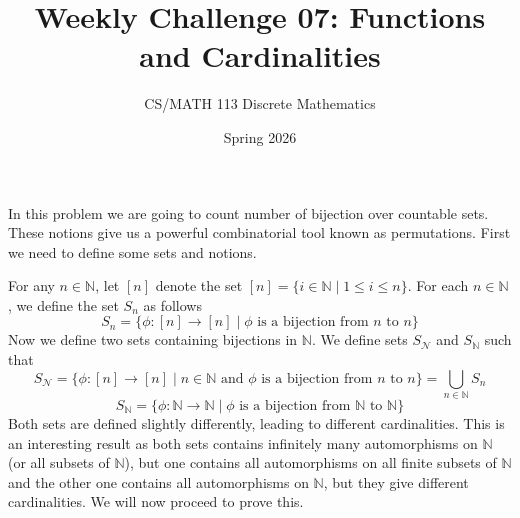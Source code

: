 \documentclass[a4paper]{exam}
\title{Weekly Challenge 07: Functions and Cardinalities}
\author{CS/MATH 113 Discrete Mathematics}
\date{Spring 2026}
\begin{document}
\maketitle



\begin{questions}
    In this problem we are going to count number of bijection over countable sets. These notions give us a powerful combinatorial tool known as permutations. First we need to define some sets and notions. 

    For any $n\in \mathbb{N}$, let $[n]$ denote the set $[n] = \{i\in \mathbb{N}\mid 1 \leq i \leq n\}$. For each $n\in \mathbb{N}$, we define the set $S_n$ as follows
    $$S_n = \{\phi: [n] \to [n] \mid \phi \text{ is a bijection from } n \text{ to } n\}$$
    Now we define two sets containing bijections in $\mathbb{N}$. 
    We define sets $S_{\mathcal{N}}$ and $S_{\mathbb{N}}$ such that 
    $$S_{\mathcal{N}} = \{\phi: [n] \to [n] \mid n \in \mathbb{N} \text{ and }\phi \text{ is a bijection from } n \text{ to } n\} = \bigcup\limits_{n\in \mathbb{N}} S_n$$
    $$S_{\mathbb{N}} = \{\phi: \mathbb{N} \to \mathbb{N} \mid \phi \text{ is a bijection from } \mathbb{N} \text{ to } \mathbb{N}\}$$
    Both sets are defined slightly differently, leading to different cardinalities. This is an interesting result as both sets contains infinitely many automorphisms on $\mathbb{N}$ (or all subsets of $\mathbb{N}$), but one contains all automorphisms on all finite subsets of $\mathbb{N}$ and the other one contains all automorphisms on $\mathbb{N}$, but they give different cardinalities. We will now proceed to prove this.
\end{questions}
\end{document}

